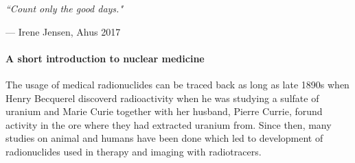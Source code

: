\documentclass[twoside,english]{uiofysmaster/uiofysmaster}
\begin{document}
\epigraph{\itshape ``Count only the good days."}{--- \textup{ Irene Jensen}, Ahus 2017}
 







\paragraph{A short introduction to nuclear medicine} \mbox{}

\noindent
The usage of medical radionuclides can be traced back as long as late 1890s when Henry Becquerel discoverd radioactivity when he was studying a sulfate of uranium and Marie Curie together with her husband, Pierre Currie, forund activity in the ore where they had extracted uranium from. Since then, many studies on animal and humans have been done which led to development of radionuclides used in therapy and imaging with radiotracers.
\end{document}
